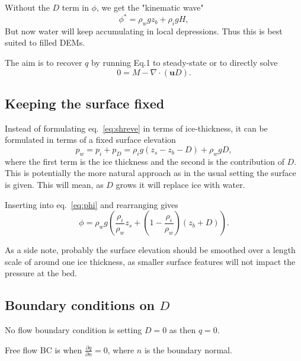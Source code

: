 \documentclass[DIV=13,halfparskip,11pt,headinclude]{scrartcl}
\begin{document}
Without the \(D\) term in \(\phi\), we get the "kinematic wave"
\begin{equation}
\phi^* = \rho_w g z_b + \rho_i g H,
\end{equation}
But now water will keep accumulating in local depressions.  Thus this
is best suited to filled DEMs.

The aim is to recover \(q\) by running Eq.1 to steady-state or to
directly solve \begin{equation}
0 = M - \nabla \cdot (\mathbf{u} D).
\end{equation}

\subsection{Keeping the surface fixed}

Instead of formulating eq.~\eqref{eq:shreve} in terms of
ice-thickness, it can be formulated in terms of a fixed surface
elevation
\begin{equation}
  p_w = p_i + p_D = \rho_i g (z_s - z_b - D) + \rho_w g D,
\end{equation}
where the first term is the ice thickness and the second is the
contribution of $D$.  This is potentially the more natural approach as
in the usual setting the surface is given.  This will mean, as $D$
grows it will replace ice with water.

Inserting into eq.~\eqref{eq:phi} and rearranging gives
\begin{equation}
\phi = \rho_w g \left( \frac{\rho_i}{\rho_w}z_s + \left(1- \frac{\rho_i}{\rho_w}\right)( z_b + D)\right).
\end{equation}

As a side note, probably the surface elevation should be smoothed over
a length scale of around one ice thickness, as smaller surface
features will not impact the pressure at the bed.

\subsection{Boundary conditions on $D$}


No flow boundary condition is setting $D=0$ as then $q=0$.

Free flow BC is when $\frac{\partial q}{\partial n}=0$, where $n$ is
the boundary normal.
\end{document}
